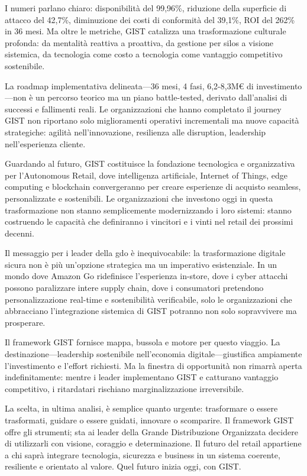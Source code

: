 I numeri parlano chiaro: disponibilità del 99,96\%, riduzione della superficie di attacco del 42,7\%, diminuzione dei costi di conformità del 39,1\%, ROI del 262\% in 36 mesi. Ma oltre le metriche, GIST catalizza una trasformazione culturale profonda: da mentalità reattiva a proattiva, da gestione per silos a visione sistemica, da tecnologia come costo a tecnologia come vantaggio competitivo sostenibile.

La roadmap implementativa delineata—36 mesi, 4 fasi, 6,2-8,3M€ di investimento—non è un percorso teorico ma un piano battle-tested, derivato dall'analisi di successi e fallimenti reali. Le organizzazioni che hanno completato il journey GIST non riportano solo miglioramenti operativi incrementali ma nuove capacità strategiche: agilità nell'innovazione, resilienza alle disruption, leadership nell'esperienza cliente.

Guardando al futuro, GIST costituisce la fondazione tecnologica e organizzativa per l'Autonomous Retail, dove intelligenza artificiale, Internet of Things, edge computing e blockchain convergeranno per creare esperienze di acquisto seamless, personalizzate e sostenibili. Le organizzazioni che investono oggi in questa trasformazione non stanno semplicemente modernizzando i loro sistemi: stanno costruendo le capacità che definiranno i vincitori e i vinti nel retail dei prossimi decenni.

Il messaggio per i leader della \gls{gdo} è inequivocabile: la trasformazione digitale sicura non è più un'opzione strategica ma un imperativo esistenziale. In un mondo dove Amazon Go ridefinisce l'esperienza in-store, dove i cyber attacchi possono paralizzare intere supply chain, dove i consumatori pretendono personalizzazione real-time e sostenibilità verificabile, solo le organizzazioni che abbracciano l'integrazione sistemica di GIST potranno non solo sopravvivere ma prosperare.

Il framework GIST fornisce mappa, bussola e motore per questo viaggio. La destinazione—leadership sostenibile nell'economia digitale—giustifica ampiamente l'investimento e l'effort richiesti. Ma la finestra di opportunità non rimarrà aperta indefinitamente: mentre i leader implementano GIST e catturano vantaggio competitivo, i ritardatari rischiano marginalizzazione irreversibile.

La scelta, in ultima analisi, è semplice quanto urgente: trasformare o essere trasformati, guidare o essere guidati, innovare o scomparire. Il framework GIST offre gli strumenti; sta ai leader della Grande Distribuzione Organizzata decidere di utilizzarli con visione, coraggio e determinazione. Il futuro del retail appartiene a chi saprà integrare tecnologia, sicurezza e business in un sistema coerente, resiliente e orientato al valore. Quel futuro inizia oggi, con GIST.

\clearpage
\printbibliography[
    heading=subbibliography,
    title={Riferimenti Bibliografici del Capitolo 5},
]

